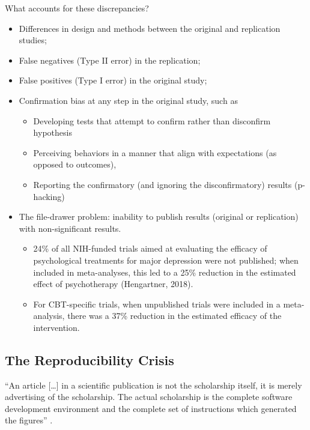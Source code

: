 \documentclass[
  english,
]{book}
\providecommand{\tightlist}{%
  \setlength{\itemsep}{0pt}\setlength{\parskip}{0pt}}
\begin{document}
What accounts for these discrepancies?

\begin{itemize}
\tightlist
\item
  Differences in design and methods between the original and replication studies;
\item
  False negatives (Type II error) in the replication;
\item
  False positives (Type I error) in the original study;
\item
  Confirmation bias at any step in the original study, such as

  \begin{itemize}
  \tightlist
  \item
    Developing tests that attempt to confirm rather than disconfirm hypothesis
  \item
    Perceiving behaviors in a manner that align with expectations (as opposed to outcomes),
  \item
    Reporting the confirmatory (and ignoring the disconfirmatory) results (p-hacking)
  \end{itemize}
\item
  The file-drawer problem: inability to publish results (original or replication) with non-significant results.

  \begin{itemize}
  \tightlist
  \item
    24\% of all NIH-funded trials aimed at evaluating the efficacy of psychological treatments for major depression were not published; when included in meta-analyses, this led to a 25\% reduction in the estimated effect of psychotherapy (Hengartner, 2018).
  \item
    For CBT-specific trials, when unpublished trials were included in a meta-analysis, there was a 37\% reduction in the estimated efficacy of the intervention.
  \end{itemize}
\end{itemize}

\hypertarget{the-reproducibility-crisis}{%
\subsection{The Reproducibility Crisis}\label{the-reproducibility-crisis}}

``An article {[}\ldots{]} in a scientific publication is not the scholarship itself, it is merely advertising of the scholarship. The actual scholarship is the complete software development environment and the complete set of instructions which generated the figures'' \citep{buckheit_wavelab_1995}.
\end{document}
